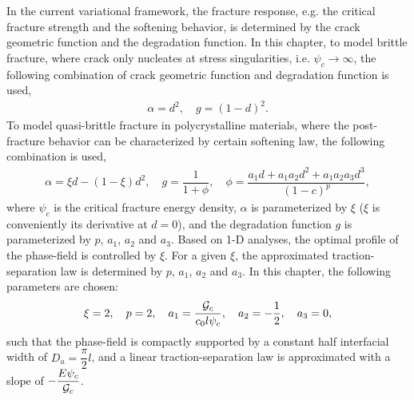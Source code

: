 In the current variational framework, the fracture response, e.g. the critical fracture strength and the softening behavior, is determined by the crack geometric function and the degradation function. In this chapter, to model brittle fracture, where crack only nucleates at stress singularities, i.e. $\psi_c \to \infty$, the following combination of crack geometric function and degradation function is used,
\begin{align}
  \alpha = d^2, \quad g = (1-d)^2.
\end{align}
To model quasi-brittle fracture in polycrystalline materials, where the post-fracture behavior can be characterized by certain softening law, the following combination is used,
\begin{align}
  \alpha = \xi d- (1-\xi) d^2, \quad g = \dfrac{1}{1+\phi}, \quad \phi = \dfrac{a_1d + a_1a_2d^2 + a_1a_2a_3d^3}{(1-c)^p},
\end{align}
where $\psi_c$ is the critical fracture energy density, $\alpha$ is parameterized by $\xi$ ($\xi$ is conveniently its derivative at $d = 0$), and the degradation function $g$ is parameterized by $p$, $a_1$, $a_2$ and $a_3$. Based on 1-D analyses, the optimal profile of the phase-field is controlled by $\xi$. For a given $\xi$, the approximated traction-separation law is determined by $p$, $a_1$, $a_2$ and $a_3$. In this chapter, the following parameters are chosen:
\begin{align}
  \xi = 2, \quad p = 2, \quad a_1 = \dfrac{{\mathcal{G}_c}}{c_0 l \psi_c}, \quad a_2 = -\dfrac{1}{2}, \quad a_3 = 0,
\end{align}
such that the phase-field is compactly supported by a constant half interfacial width of $D_u = \dfrac{\pi}{2}l$, and a linear traction-separation law is approximated with a slope of $-\dfrac{E\psi_c}{{\mathcal{G}_c}}$.


